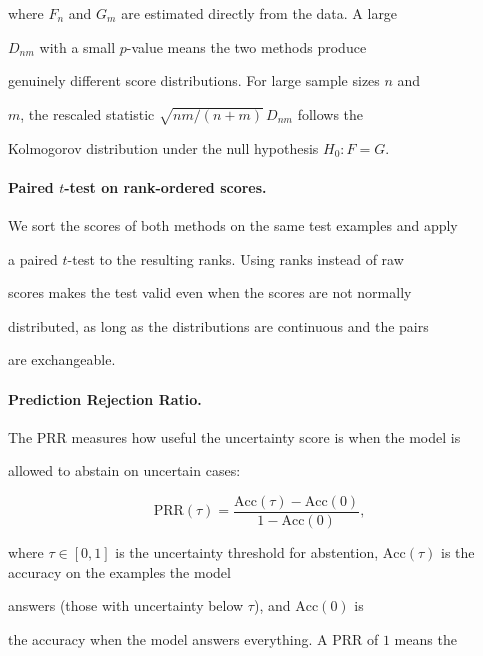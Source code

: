 \documentclass[10pt,twoside]{article}
\numberwithin{equation}{section}
\begin{document}
where $F_n$ and $G_m$ are estimated directly from the data. A large

$D_{nm}$ with a small $p$-value means the two methods produce

genuinely different score distributions. For large sample sizes $n$ and

$m$, the rescaled statistic $\sqrt{nm/(n+m)}\,D_{nm}$ follows the

Kolmogorov distribution under the null hypothesis $H_0: F = G$.



\paragraph{Paired $t$-test on rank-ordered scores.}

We sort the scores of both methods on the same test examples and apply

a paired $t$-test to the resulting ranks. Using ranks instead of raw

scores makes the test valid even when the scores are not normally

distributed, as long as the distributions are continuous and the pairs

are exchangeable.



\paragraph{Prediction Rejection Ratio.}

The PRR measures how useful the uncertainty score is when the model is

allowed to abstain on uncertain cases:

\begin{equation}

  \mathrm{PRR}(\tau) =

  \frac{\mathrm{Acc}(\tau) - \mathrm{Acc}(0)}

       {1 - \mathrm{Acc}(0)},

\end{equation}

where $\tau \in [0,1]$ is the uncertainty threshold for abstention, $\mathrm{Acc}(\tau)$ is the accuracy on the examples the model

answers (those with uncertainty below $\tau$), and $\mathrm{Acc}(0)$ is

the accuracy when the model answers everything. A PRR of $1$ means the
\end{document}
